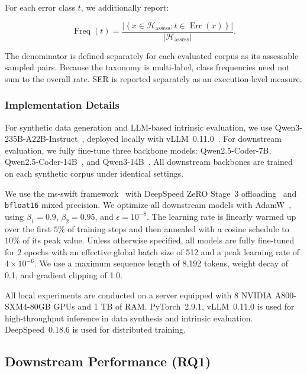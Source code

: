 \documentclass[letterpaper,journal]{IEEEtran}
\begin{document}
For each error class $t$, we additionally report:

\begin{equation}
\label{eq:per-type-semantic-error-frequency}
\operatorname{Freq}(t) = \frac{\left|\left\{x\in\mathcal{H}_{\mathrm{assess}} : t\in\operatorname{Err}(x)\right\}\right|}{\left|\mathcal{H}_{\mathrm{assess}}\right|}.
\end{equation}

The denominator is defined separately for each evaluated corpus as its assessable sampled pairs. Because the taxonomy is multi-label, class frequencies need not sum to the overall rate. SER is reported separately as an execution-level measure.

\subsubsection{Implementation Details}
\label{subsec:implementation_details}

For synthetic data generation and LLM-based intrinsic evaluation, we use Qwen3-235B-A22B-Instruct~\cite{yang2025qwen3}, deployed locally with vLLM~0.11.0~\cite{kwon2023efficient}. For downstream evaluation, we fully fine-tune three backbone models: Qwen2.5-Coder-7B, Qwen2.5-Coder-14B~\cite{hui2024qwen25coder}, and Qwen3-14B~\cite{yang2025qwen3}. All downstream backbones are trained on each synthetic corpus under identical settings.

We use the ms-swift framework~\cite{zhao2025swift} with DeepSpeed ZeRO Stage~3 offloading~\cite{rajbhandari2021zero} and \texttt{bfloat16} mixed precision. We optimize all downstream models with AdamW~\cite{loshchilov2019decoupled}, using $\beta_1=0.9$, $\beta_2=0.95$, and $\epsilon=10^{-8}$. The learning rate is linearly warmed up over the first $5\%$ of training steps and then annealed with a cosine schedule to $10\%$ of its peak value. Unless otherwise specified, all models are fully fine-tuned for 2 epochs with an effective global batch size of 512 and a peak learning rate of $4\times10^{-6}$. We use a maximum sequence length of 8{,}192 tokens, weight decay of 0.1, and gradient clipping of 1.0.

All local experiments are conducted on a server equipped with 8 NVIDIA A800-SXM4-80GB GPUs and 1 TB of RAM. PyTorch~2.9.1, vLLM~0.11.0 is used for high-throughput inference in data synthesis and intrinsic evaluation. DeepSpeed~0.18.6 is used for distributed training.


\subsection{Downstream Performance (RQ1)}
\label{subsec:downstream_performance}
\end{document}
